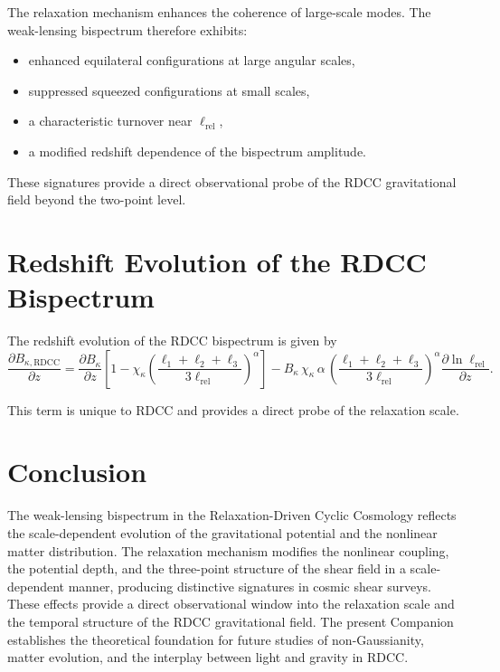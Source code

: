 \documentclass[11pt,a4paper]{article}
\begin{document}
The relaxation mechanism enhances the coherence of large-scale modes. The 
weak-lensing bispectrum therefore exhibits:

\begin{itemize}
    \item enhanced equilateral configurations at large angular scales,
    \item suppressed squeezed configurations at small scales,
    \item a characteristic turnover near $\ell_{\mathrm{rel}}$,
    \item a modified redshift dependence of the bispectrum amplitude.
\end{itemize}

These signatures provide a direct observational probe of the RDCC gravitational 
field beyond the two-point level.
\section{Redshift Evolution of the RDCC Bispectrum}

The redshift evolution of the RDCC bispectrum is given by
\begin{equation}
    \frac{\partial B_{\kappa,\mathrm{RDCC}}}{\partial z}
    = \frac{\partial B_{\kappa}}{\partial z}
      \left[
        1 - \chi_{\kappa}
        \left(
          \frac{\ell_{1} + \ell_{2} + \ell_{3}}{3\ell_{\mathrm{rel}}}
        \right)^{\alpha}
      \right]
      - B_{\kappa}\,
        \chi_{\kappa}\,\alpha\,
        \left(
          \frac{\ell_{1} + \ell_{2} + \ell_{3}}{3\ell_{\mathrm{rel}}}
        \right)^{\alpha}
        \frac{\partial \ln \ell_{\mathrm{rel}}}{\partial z}.
\end{equation}

This term is unique to RDCC and provides a direct probe of the relaxation scale.
\section{Conclusion}

The weak-lensing bispectrum in the Relaxation-Driven Cyclic Cosmology reflects the 
scale-dependent evolution of the gravitational potential and the nonlinear matter 
distribution. The relaxation mechanism modifies the nonlinear coupling, the 
potential depth, and the three-point structure of the shear field in a 
scale-dependent manner, producing distinctive signatures in cosmic shear surveys. 
These effects provide a direct observational window into the relaxation scale and 
the temporal structure of the RDCC gravitational field. The present Companion 
establishes the theoretical foundation for future studies of non-Gaussianity, 
matter evolution, and the interplay between light and gravity in RDCC.


\nocite{*}

\end{document}
